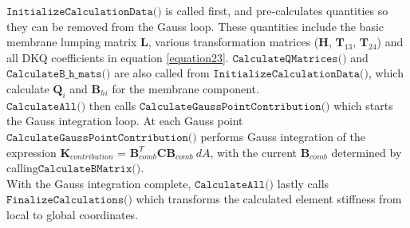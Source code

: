 $\texttt{InitializeCalculationData()}$ is called first, and pre-calculates quantities so they can be removed from the Gauss loop. These quantities include the basic membrane lumping matrix $\textbf{L}$, various transformation matrices ($\textbf{H}$, $\textbf{T}_{13}$, $\textbf{T}_{24}$) and all DKQ coefficients in equation  \eqref{equation23}. $\texttt{CalculateQMatrices()}$ and $\texttt{CalculateB$\_$h$\_$mats()}$ are also called from $\texttt{InitializeCalculationData()}$, which calculate $\textbf{Q}_i$ and $\textbf{B}_{hi}$ for the membrane component.\\

$\texttt{CalculateAll()}$ then calls $\texttt{CalculateGaussPointContribution()}$ which starts the Gauss integration loop. At each Gauss point $\texttt{CalculateGaussPointContribution()}$ performs Gauss integration of the expression $\textbf{K}_{contribution}$ = $\textbf{B}_{comb}^T \textbf{C} \textbf{B}_{comb}\  dA$, with the current $\textbf{B}_{comb}$ determined by calling\break$\texttt{CalculateBMatrix()}$. \\

With the Gauss integration complete, $\texttt{CalculateAll()}$ lastly calls $\texttt{FinalizeCalculations()}$ which transforms the calculated element stiffness from local to global coordinates.


